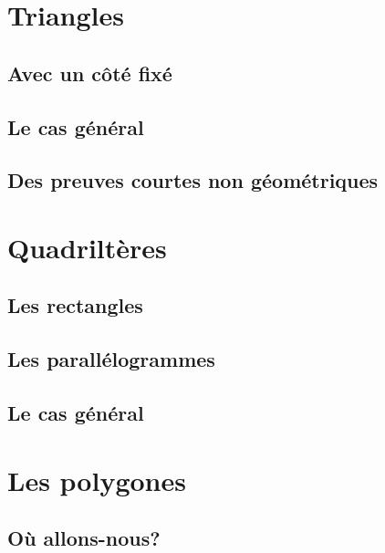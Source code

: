 \documentclass[12pt]{amsart}
\begin{document}


\section{Triangles}

\subsection{Avec un côté fixé}



\subsection{Le cas général}



\subsection{Des preuves courtes non géométriques}





\section{Quadriltères}

\subsection{Les rectangles}



\subsection{Les parallélogrammes}



\subsection{Le cas général}





\section{Les polygones}

\subsection{Où allons-nous?}

\end{document}

